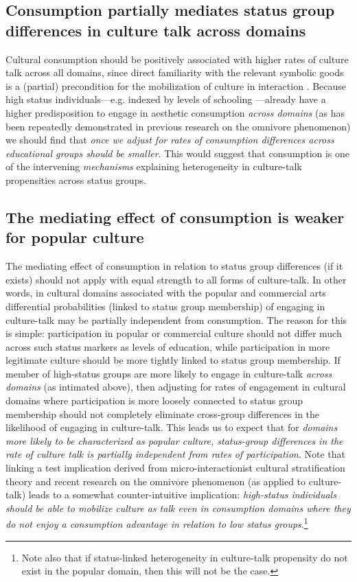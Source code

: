 \subsection{Consumption partially mediates status group differences in culture talk across domains}
Cultural consumption should be positively associated with higher rates of culture talk across all domains, since direct familiarity with the relevant symbolic goods is a (partial) precondition for the mobilization of culture in interaction \citep{dimaggio87}. Because high status individuals---e.g. indexed by levels of schooling \citep{bourdieu84, bourdieu_darbel91, meyer77}---already have a higher predisposition to engage in aesthetic consumption \emph{across domains} (as has been repeatedly demonstrated in previous research on the omnivore phenomenon) we should find that \emph{once we adjust for rates of consumption differences across educational groups should be smaller}. This would suggest that consumption is one of the intervening \emph{mechanisms} explaining heterogeneity in culture-talk propensities across status groups. 

\subsection{The mediating effect of consumption is weaker for popular culture}
The mediating effect of consumption in relation to status group differences (if it exists) should not apply with equal strength to all forms of culture-talk. In other words, in cultural domains associated with the popular and commercial arts differential probabilities (linked to status group membership) of engaging in culture-talk may be partially independent from consumption.  The reason for this is simple: participation in popular or commercial culture should not differ much across such status markers as levels of education, while participation in more legitimate culture should be more tightly linked to status group membership.  If member of high-status groups are more likely to engage in culture-talk \emph{across domains} (as intimated above), then adjusting for rates of engagement in cultural domains where participation is more loosely connected to status group membership should not completely eliminate cross-group differences in the likelihood of engaging in culture-talk.  This leads us to expect that for \emph{domains more likely to be characterized as popular culture, status-group differences in the rate of culture talk is partially independent from rates of participation}. Note that linking a test implication derived from micro-interactionist cultural stratification theory and recent research on the omnivore phenomenon (as applied to culture-talk) leads to a somewhat counter-intuitive implication: \emph{high-status individuals should be able to mobilize culture as talk even in consumption domains where they do not enjoy a consumption advantage in relation to low status groups}.\footnote{Note also that if status-linked heterogeneity in culture-talk propensity do not exist in the popular domain, then this will not be the case.} 

